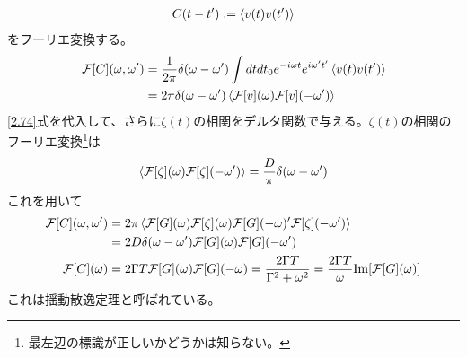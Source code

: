 \documentclass[autodetect-engine,dvipdfmx-if-dvi,ja=standard]{bxjsarticle}
\theoremstyle{break}
\begin{document}
                \begin{align}
                    C(t-t'):=\braket{v(t)v(t')}
                \end{align}
                をフーリエ変換する。
                \begin{align}
                    \mathcal{F}[C](\omega,\omega')&=\frac{1}{2\pi}\delta(\omega-\omega')\int dt dt_0  e^{-i\omega t}e^{i\omega' t'}\braket{v(t)v(t')}\\
                    &=2\pi\delta(\omega-\omega')\braket{\mathcal{F}[v](\omega)\mathcal{F}[v](-\omega')}
                \end{align}
                \eqref{2.74}式を代入して、さらに$\zeta(t)$の相関をデルタ関数で与える。$\zeta(t)$の相関のフーリエ変換\footnote{最左辺の標識が正しいかどうかは知らない。}は
                \begin{align}
                    \braket{\mathcal{F}[\zeta](\omega)\mathcal{F}[\zeta](-\omega')}=\frac{D}{\pi}\delta(\omega-\omega')
                \end{align}
                これを用いて
                \begin{align}
                    \mathcal{F}[C](\omega,\omega')&=2\pi\braket{\mathcal{F}[G](\omega)\mathcal{F}[\zeta](\omega)\mathcal{F}[G](-\omega)'\mathcal{F}[\zeta](-\omega')}\\
                    &=2D\delta(\omega-\omega')\mathcal{F}[G](\omega)\mathcal{F}[G](-\omega')\\
                    \mathcal{F}[C](\omega)&=2\Gamma T \mathcal{F}[G](\omega)\mathcal{F}[G](-\omega)=\frac{2\Gamma T}{\Gamma^2+\omega^2}=\frac{2\Gamma T}{\omega}\mathrm{Im}[\mathcal{F}[G](\omega)]
                \end{align}
                これは揺動散逸定理と呼ばれている。
\end{document}
